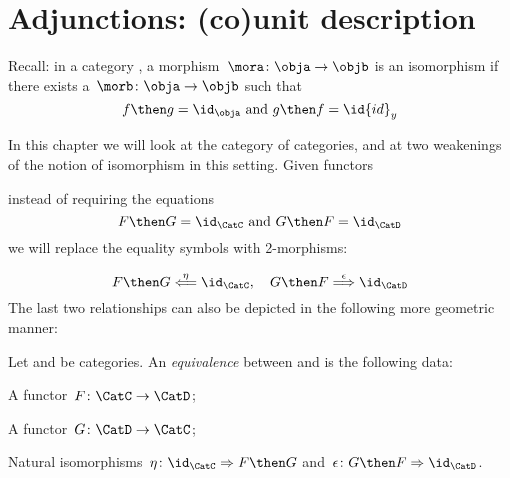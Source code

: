 

\section{Adjunctions: (co)unit description}

Recall: in a category \CatC, a morphism~$\mora \colon \obja \to \objb$ is an isomorphism if there exists a~$\morb \colon \obja \rightarrow \objb$ such that
\begin{equation*}
  f \then g = \id_\obja \text{ and } g \then f = \id{id}_y
\end{equation*}

In this chapter we will look at the category \Category of categories, and at two weakenings of the notion of isomorphism in this setting.
Given functors
\begin{center}
\end{center}
instead of requiring the equations
\begin{equation*}
  F \then G = \id_\CatC  \text{ and } G \then F = \id_\CatD
\end{equation*}
we will replace the equality symbols with 2-morphisms:

\begin{equation*}
  F \then G \overset{\eta}{\Longleftarrow} \id_\CatC, \quad  G \then F \overset{\epsilon}{\Longrightarrow} \id_\CatD
\end{equation*}
The last two relationships can also be depicted in the following more geometric manner:
\begin{center}
  \hspace{1cm}
\end{center}

\begin{ctdefinition}
  \label{def:cat-equivalence}
  Let \CatC and \CatD be categories. An \emph{equivalence} between \CatC and \CatD is the following data:
  \begin{compactenum}
    \item A functor~$F\colon  \CatC \to \CatD$;
    \item A functor~$G\colon \CatD \to \CatC$;
    \item Natural isomorphisms~$\eta \colon \id_\CatC \Rightarrow F \then G$ and~$\epsilon\colon  G \then F \Rightarrow \id_\CatD$.
  \end{compactenum}
\end{ctdefinition}


